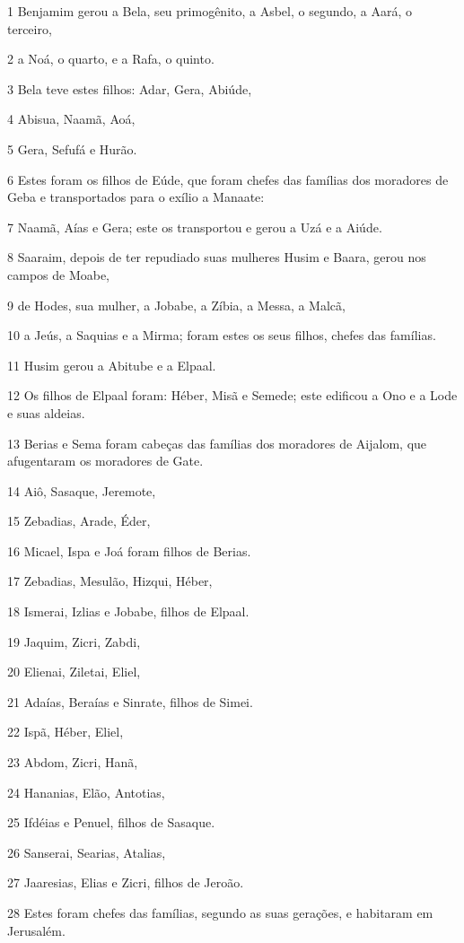 \par 1 Benjamim gerou a Bela, seu primogênito, a Asbel, o segundo, a Aará, o terceiro,
\par 2 a Noá, o quarto, e a Rafa, o quinto.
\par 3 Bela teve estes filhos: Adar, Gera, Abiúde,
\par 4 Abisua, Naamã, Aoá,
\par 5 Gera, Sefufá e Hurão.
\par 6 Estes foram os filhos de Eúde, que foram chefes das famílias dos moradores de Geba e transportados para o exílio a Manaate:
\par 7 Naamã, Aías e Gera; este os transportou e gerou a Uzá e a Aiúde.
\par 8 Saaraim, depois de ter repudiado suas mulheres Husim e Baara, gerou nos campos de Moabe,
\par 9 de Hodes, sua mulher, a Jobabe, a Zíbia, a Messa, a Malcã,
\par 10 a Jeús, a Saquias e a Mirma; foram estes os seus filhos, chefes das famílias.
\par 11 Husim gerou a Abitube e a Elpaal.
\par 12 Os filhos de Elpaal foram: Héber, Misã e Semede; este edificou a Ono e a Lode e suas aldeias.
\par 13 Berias e Sema foram cabeças das famílias dos moradores de Aijalom, que afugentaram os moradores de Gate.
\par 14 Aiô, Sasaque, Jeremote,
\par 15 Zebadias, Arade, Éder,
\par 16 Micael, Ispa e Joá foram filhos de Berias.
\par 17 Zebadias, Mesulão, Hizqui, Héber,
\par 18 Ismerai, Izlias e Jobabe, filhos de Elpaal.
\par 19 Jaquim, Zicri, Zabdi,
\par 20 Elienai, Ziletai, Eliel,
\par 21 Adaías, Beraías e Sinrate, filhos de Simei.
\par 22 Ispã, Héber, Eliel,
\par 23 Abdom, Zicri, Hanã,
\par 24 Hananias, Elão, Antotias,
\par 25 Ifdéias e Penuel, filhos de Sasaque.
\par 26 Sanserai, Searias, Atalias,
\par 27 Jaaresias, Elias e Zicri, filhos de Jeroão.
\par 28 Estes foram chefes das famílias, segundo as suas gerações, e habitaram em Jerusalém.
